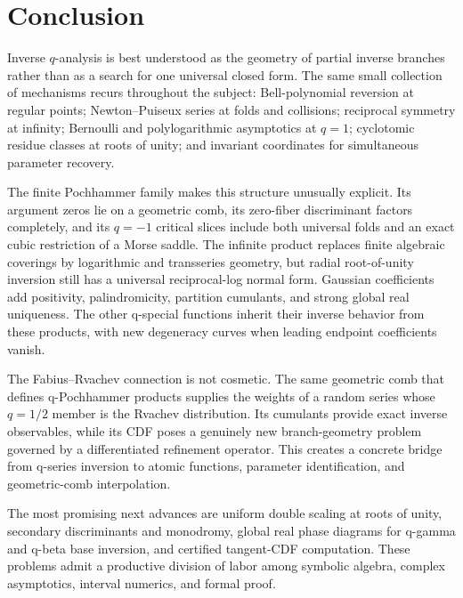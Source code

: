 \documentclass[11pt,letterpaper,oneside,openany]{book}
\theoremstyle{definition}
\theoremstyle{remark}
\begin{document}
\backmatter

\chapter*{Conclusion}
Inverse \(q\)-analysis is best understood as the geometry of partial inverse
branches rather than as a search for one universal closed form.  The same
small collection of mechanisms recurs throughout the subject: Bell-polynomial
reversion at regular points; Newton--Puiseux series at folds and collisions;
reciprocal symmetry at infinity; Bernoulli and polylogarithmic asymptotics at
\(q=1\); cyclotomic residue classes at roots of unity; and invariant
coordinates for simultaneous parameter recovery.

The finite Pochhammer family makes this structure unusually explicit.  Its
argument zeros lie on a geometric comb, its zero-fiber discriminant factors
completely, and its \(q=-1\) critical slices include both universal folds and an
exact cubic restriction of a Morse saddle.  The infinite product replaces
finite algebraic coverings by logarithmic and transseries geometry, but radial
root-of-unity inversion still has a universal reciprocal-log normal form.
Gaussian coefficients add positivity, palindromicity, partition cumulants, and
strong global real uniqueness.  The other q-special functions inherit their
inverse behavior from these products, with new degeneracy curves when leading
endpoint coefficients vanish.

The Fabius--Rvachev connection is not cosmetic.  The same geometric comb that
defines q-Pochhammer products supplies the weights of a random series whose
\(q=1/2\) member is the Rvachev distribution.  Its cumulants provide exact
inverse observables, while its CDF poses a genuinely new branch-geometry
problem governed by a differentiated refinement operator.  This creates a
concrete bridge from q-series inversion to atomic functions, parameter
identification, and geometric-comb interpolation.

The most promising next advances are uniform double scaling at roots of unity,
secondary discriminants and monodromy, global real phase diagrams for
q-gamma and q-beta base inversion, and certified tangent-CDF computation.
These problems admit a productive division of labor among symbolic algebra,
complex asymptotics, interval numerics, and formal proof.
\end{document}
